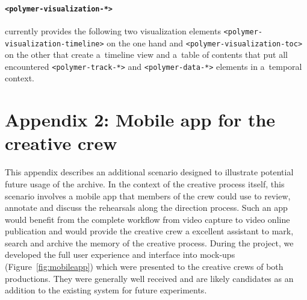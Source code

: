\documentclass[conference]{IEEEtran}
\newcommand{\todo}[1]{\noindent\textcolor{red}{{\bf \{ToDo} #1{\bf \}}}}
\begin{document}
\paragraph*{\texttt{<polymer-visualization-*>}} currently provides the
    following two visualization elements
    \texttt{<polymer-visualization-timeline>} on the one hand and 
    \texttt{<polymer-visualization-toc>} on the other
    that create a~timeline view and a~table of contents
    that put all encountered \texttt{<polymer-track-*>}
    and \texttt{<polymer-data-*>} elements in a~temporal context.


\section*{Appendix 2: Mobile app for the creative crew} 

This appendix describes an additional scenario designed to illustrate potential future usage of the archive. In the context of the creative process itself, this scenario involves a mobile app that members of the crew could use to review, annotate and discuss the rehearsals along the direction process. Such an app would benefit from the complete workflow from video capture to video online publication and would provide the creative crew a excellent assistant to mark, search and archive the memory of the creative process. During the project, we developed the full user experience and interface into mock-ups (Figure~\ref{fig:mobileapp})
which were presented to the creative crews of both productions. They were generally well received and are likely candidates 
as an addition to the existing system for future experiments. 
\end{document}
